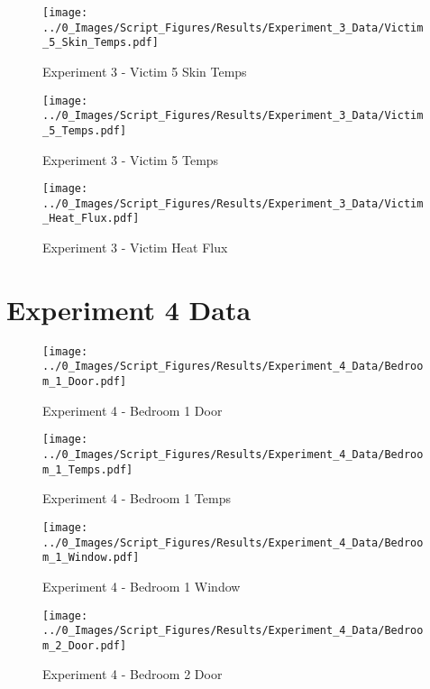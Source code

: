 	\clearpage

	\begin{figure}[H]
		\centering
		\texttt{[image: ../0\_Images/Script\_Figures/Results/Experiment\_3\_Data/Victim\_5\_Skin\_Temps.pdf]}
		\caption[]{Experiment 3 - Victim 5 Skin Temps}
	\end{figure}
 

	\begin{figure}[H]
		\centering
		\texttt{[image: ../0\_Images/Script\_Figures/Results/Experiment\_3\_Data/Victim\_5\_Temps.pdf]}
		\caption[]{Experiment 3 - Victim 5 Temps}
	\end{figure}
 
	\clearpage

	\begin{figure}[H]
		\centering
		\texttt{[image: ../0\_Images/Script\_Figures/Results/Experiment\_3\_Data/Victim\_Heat\_Flux.pdf]}
		\caption[]{Experiment 3 - Victim Heat Flux}
	\end{figure}
 

\clearpage		\large
\section{Experiment 4 Data} \label{App:Exp4Results} 

	\begin{figure}[H]
		\centering
		\texttt{[image: ../0\_Images/Script\_Figures/Results/Experiment\_4\_Data/Bedroom\_1\_Door.pdf]}
		\caption[]{Experiment 4 - Bedroom 1 Door}
	\end{figure}
 

	\begin{figure}[H]
		\centering
		\texttt{[image: ../0\_Images/Script\_Figures/Results/Experiment\_4\_Data/Bedroom\_1\_Temps.pdf]}
		\caption[]{Experiment 4 - Bedroom 1 Temps}
	\end{figure}
 
	\clearpage

	\begin{figure}[H]
		\centering
		\texttt{[image: ../0\_Images/Script\_Figures/Results/Experiment\_4\_Data/Bedroom\_1\_Window.pdf]}
		\caption[]{Experiment 4 - Bedroom 1 Window}
	\end{figure}
 

	\begin{figure}[H]
		\centering
		\texttt{[image: ../0\_Images/Script\_Figures/Results/Experiment\_4\_Data/Bedroom\_2\_Door.pdf]}
		\caption[]{Experiment 4 - Bedroom 2 Door}
	\end{figure}
 
